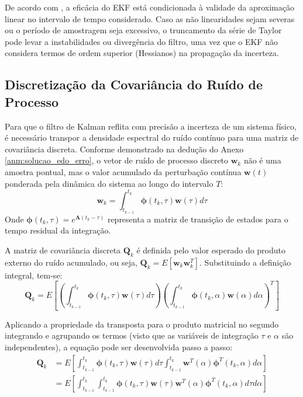 \documentclass[a4paper,12pt]{article}
\begin{document}
De acordo com , a eficácia do EKF está condicionada à validade da aproximação linear no intervalo de tempo considerado. Caso as não linearidades sejam severas ou o período de amostragem seja excessivo, o truncamento da série de Taylor pode levar a instabilidades ou divergência do filtro, uma vez que o EKF não considera termos de ordem superior (Hessianos) na propagação da incerteza.

\subsection{Discretização da Covariância do Ruído de Processo}
\label{subsec:DiscretizacaoQ}

Para que o filtro de Kalman reflita com precisão a incerteza de um sistema físico, é necessário transpor a densidade espectral do ruído contínuo para uma matriz de covariância discreta. Conforme demonstrado na dedução do Anexo \ref{anm:solucao_edo_erro}, o vetor de ruído de processo discreto $\mathbf{w}_{k}$ não é uma amostra pontual, mas o valor acumulado da perturbação contínua $\mathbf{w}(t)$ ponderada pela dinâmica do sistema ao longo do intervalo $T$:
\begin{equation}
    \mathbf{w}_{k} = \int_{t_{k-1}}^{t_{k}} \mathbf{\phi}(t_{k}, \tau) \mathbf{w}(\tau) d\tau
\end{equation}
Onde $\mathbf{\phi}(t_{k}, \tau) = e^{\mathbf{A}(t_k - \tau)}$ representa a matriz de transição de estados para o tempo residual da integração. 

A matriz de covariância discreta $\mathbf{Q}_k$ é definida pelo valor esperado do produto externo do ruído acumulado, ou seja, $\mathbf{Q}_k = E[\mathbf{w}_{k} \mathbf{w}_{k}^T]$. Substituindo a definição integral, tem-se:
\begin{equation}
    \mathbf{Q}_k = E \left[ \left( \int_{t_{k-1}}^{t_{k}} \mathbf{\phi}(t_{k}, \tau) \mathbf{w}(\tau) d\tau \right) \left( \int_{t_{k-1}}^{t_{k}} \mathbf{\phi}(t_{k}, \alpha) \mathbf{w}(\alpha) d\alpha \right)^T \right]
\end{equation}

Aplicando a propriedade da transposta para o produto matricial no segundo integrando e agrupando os termos (visto que as variáveis de integração $\tau$ e $\alpha$ são independentes), a equação pode ser desenvolvida passo a passo:
\begin{align}
    \mathbf{Q}_k &= E \left[ \int_{t_{k-1}}^{t_{k}} \mathbf{\phi}(t_{k}, \tau) \mathbf{w}(\tau) d\tau \int_{t_{k-1}}^{t_{k}} \mathbf{w}^T(\alpha) \mathbf{\phi}^T(t_{k}, \alpha) d\alpha \right] \nonumber \\
    &= E \left[ \int_{t_{k-1}}^{t_{k}} \int_{t_{k-1}}^{t_{k}} \mathbf{\phi}(t_{k}, \tau) \mathbf{w}(\tau) \mathbf{w}^T(\alpha) \mathbf{\phi}^T(t_{k}, \alpha) d\tau d\alpha \right]
\end{align}
\end{document}
